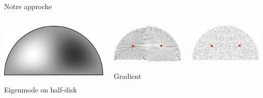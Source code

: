 \begin{frame}{Notre approche}
\pause[1]
    \begin{columns}
        \begin{column}{0.33\textwidth}
        \centering
        \includegraphics[scale=0.08]{images/demiDiscValProp.eps} \hspace{0.2cm}
        \caption{\footnotesize Eigenmode on half-disk}
        \end{column}
        \begin{column}{0.33\textwidth}
        \centering
        \includegraphics[scale=0.36]{images/val_prop_7.pdf} \hspace{0.2cm}
        \caption{\footnotesize Gradient}
        \end{column}
        \begin{column}{0.33\textwidth}
        \centering
        \includegraphics[scale=0.36]{images/demiDiscValPropSheet_2.pdf} \hspace{0.2cm}

\end{column}
\end{columns}
\end{frame}
